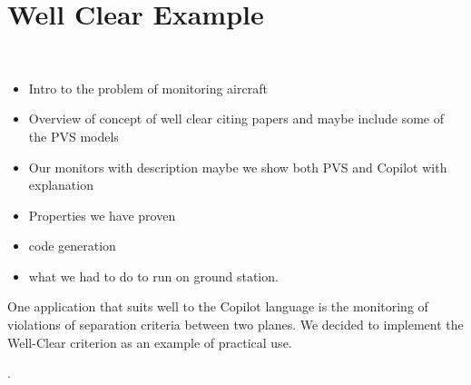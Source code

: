 \section{Well Clear Example}~\label{sec:WellClear}


\begin{itemize}
\item Intro to the problem of monitoring aircraft
\item Overview of concept of well clear citing papers and maybe include some of the PVS models
\item Our monitors with description maybe we show both PVS and Copilot with explanation
\item Properties we have proven
\item code generation 
\item what we had to do to run on ground station. 
\end{itemize}

One application that suits well to the Copilot language is the monitoring of violations of separation criteria between two planes. We decided to implement the Well-Clear criterion as an example of practical use.

.


